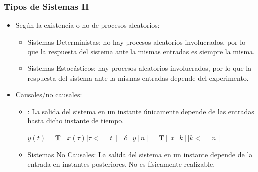 
\begin{frame}
  \frametitle{Tipos de Sistemas II}

  \vspace{-0,3cm}

  \begin{figure}
    \centering
    \small
  \end{figure}

  \vspace{-0.25cm}

  \begin{itemize}
    \item <1-> Seg\'{u}n la existencia o no de procesos aleatorios:
    \begin{itemize}
      \item \alert{Sistemas Deterministas}: no hay procesos aleatorios involucrados, por lo que la respuesta del sistema ante la mismas entradas es siempre la misma.
      \item \alert{Sistemas Estoc\'{a}sticos}: hay procesos aleatorios involucrados, por lo que la respuesta del sistema ante la mismas entradas depende del experimento.
    \end{itemize}

    \item <2-> Causales/no causales:
    \begin{itemize}
      \item \color{olivegreen}{Sistemas Causales}\color{black}: La salida del sistema en un instante únicamente depende de las entradas hasta dicho instante de tiempo. 

  \vspace{0.2cm}

     \hspace{0.4cm} $y(t)=\bm{T} [ \:x(\tau)|\tau<=t\: ] \: \:$       ó          $\: \:y[n]=\bm{T}[\: x[k]|k<=n\:]$ 
     
     \vspace{0.2cm}
     
      \item \alert{Sistemas No Causales}: La salida del sistema en un instante depende de la entrada en instantes posteriores. No es físicamente realizable. 
    \end{itemize}

  \end{itemize}

\vspace{-0.4cm}

\end{frame}

